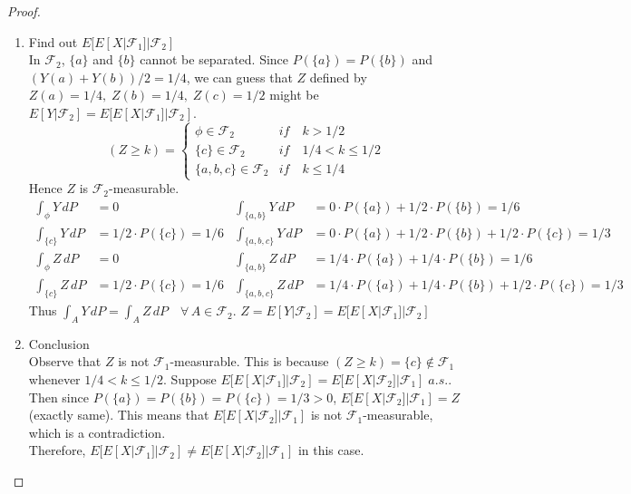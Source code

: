 \documentclass[12pt, A4]{article}
\newcommand{\F}{\mathcal{F}}
\begin{document}
\begin{proof}
\begin{enumerate}
		\item Find out $E[E[X|\F_1]|\F_2]$\\
		In $\F_2$, $\{a\}$ and $\{b\}$ cannot be separated. Since $P(\{a\})=P(\{b\})$ and $(Y(a)+Y(b))/2=1/4$, we can guess that $Z$ defined by $Z(a)=1/4, \; Z(b)=1/4, \; Z(c)=1/2$ might be $E[Y|\F_2]=E[E[X|\F_1]|\F_2]$.
		$$(Z\geq k) = 
		\begin{cases}
			\phi \in \F_2 & if\quad k>1/2 \\ \{c\}\in \F_2 & if \quad 1/4<k\leq 1/2 \\  \{a,b,c\}\in \F_2 & if\quad k\leq 1/4 
		\end{cases}$$
		Hence $Z$ is $\F_2$-measurable.
		\begin{align*}
			\int_\phi Y\, dP &= 0	 &	 \int_{\{a,b\}} Y\, dP&= 0\cdot P(\{a\})+1/2\cdot P(\{b\})=1/6   \\
			 \int_{\{c\}} Y\, dP&= 1/2 \cdot P(\{c\})=1/6	&	 \int_{\{a,b,c\}} Y\,dP &=0\cdot P(\{a\})+1/2 \cdot P(\{b\})+1/2\cdot P(\{c\})=1/3 \\
			 \int_\phi Z\, dP &= 0	 &	 \int_{\{a,b\}} Z\, dP&= 1/4\cdot P(\{a\})+1/4\cdot P(\{b\})=1/6   \\
			 \int_{\{c\}} Z\, dP&= 1/2\cdot P(\{c\})=1/6	&	 \int_{\{a,b,c\}} Z\,dP &=1/4 \cdot P(\{a\})+1/4\cdot P(\{b\})+1/2\cdot P(\{c\})=1/3 
		\end{align*}
		Thus $\int_A Y\,dP=\int_A Z\, dP \quad \forall \, A\in \F_2$. \quad $Z=E[Y|\F_2]=E[E[X|\F_1]|\F_2]$
		
		\item Conclusion \\
		Observe that $Z$ is not $\F_1$-measurable. This is because $(Z\geq k)=\{c\}\notin \F_1$ whenever $1/4<k\leq 1/2$. Suppose $E[E[X|\F_1]|\F_2] = E[E[X|\F_2]|\F_1]\; a.s.$. Then since $P(\{a\})=P(\{b\})=P(\{c\})=1/3 >0$, \; $E[E[X|\F_2]|\F_1]=Z$ (exactly same). This means that $E[E[X|\F_2]|\F_1]$ is not $\F_1$-measurable, which is a contradiction. \\ Therefore, $E[E[X|\F_1]|\F_2] \neq E[E[X|\F_2]|\F_1]$ in this case.
	\end{enumerate}
\end{proof}
\clearpage
\end{document}
